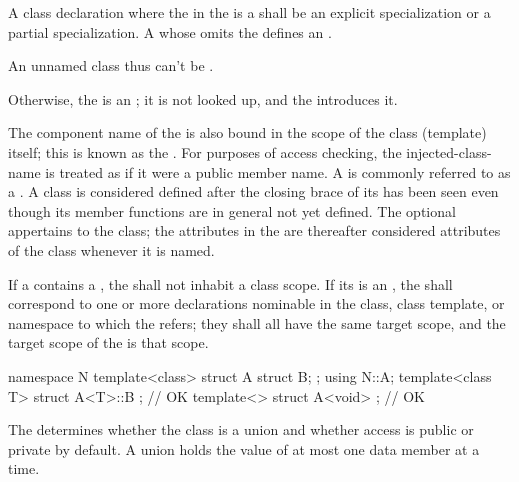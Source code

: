 A class declaration where the 
in the  is a 
shall be an explicit specialization or
a partial specialization.
A  whose
 omits the
 defines an .
\begin{note}
An unnamed class thus can't
be .
\end{note}
Otherwise, the  is an ;
it is not looked up, and the  introduces it.

\pnum
{}%
The component name of the
 is also bound in the scope of the class (template)
itself; this is known as the .
For purposes of access checking, the injected-class-name is treated as
if it were a public member name.
A  is commonly referred to as a .
A class is considered defined after the closing brace of its
 has been seen even though its member
functions are in general not yet defined.
The optional  appertains to the class; the attributes in
the  are thereafter considered attributes of the class
whenever it is named.

\pnum
If a  contains a ,
the  shall not inhabit a class scope.
If its  is an ,
the  shall correspond to
one or more declarations nominable in
the class, class template, or namespace to which the
 refers;
they shall all have the same target scope, and the target scope of the
 is that scope.
\begin{example}
\begin{codeblock}
namespace N {
  template<class>
  struct A {
    struct B;
  };
}
using N::A;
template<class T> struct A<T>::B {};    // OK
template<> struct A<void> {};           // OK
\end{codeblock}
\end{example}

\pnum
\begin{note}
The  determines
whether the class is a union and
whether access is public or private by default.
A union holds the value of at most one data member at a time.
\end{note}


